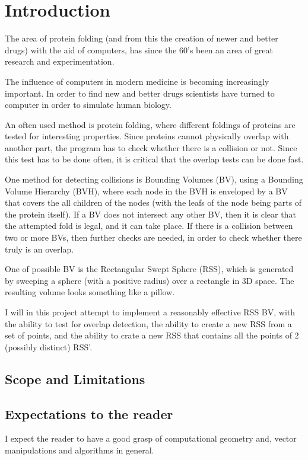 
\section{Introduction}
\label{introduction}

The area of protein folding (and from this the creation of newer and better drugs) with the aid of computers, has since the 60's been an area of great research and experimentation. 


The influence of computers in modern medicine is becoming increasingly important. In order to find new and better drugs scientists have turned to computer in order to simulate human biology.

An often used method is protein folding, where different foldings of proteins are tested for interesting properties. Since proteins cannot physically overlap with another part, the program has to check whether there is a collision or not. Since this test has to be done often, it is critical that the overlap tests can be done fast. 

One method for detecting collisions is Bounding Volumes (BV), using a Bounding Volume Hierarchy (BVH), where each node in the BVH is enveloped by a BV that covers the all children of the nodes (with the leafs of the node being parts of the protein itself). If a BV does not intersect any other BV, then it is clear that the attempted fold is legal, and it can take place. If there is a collision between two or more BVs, then further checks are needed, in order to check whether there truly is an overlap.

One of possible BV is the Rectangular Swept Sphere (RSS), which is generated by sweeping a sphere (with a positive radius) over a rectangle in 3D space. The resulting volume looks something like a pillow.

I will in this project attempt to implement a reasonably effective RSS BV, with the ability to test for overlap detection, the ability to create a new RSS from a set of points, and the ability to crate a new RSS that contains all the points of 2 (possibly distinct) RSS'.

\subsection{Scope and Limitations}
\label{scope}

\subsection{Expectations to the reader}
 I expect the reader to have a good grasp of computational geometry and, vector manipulations and algorithms in general.

